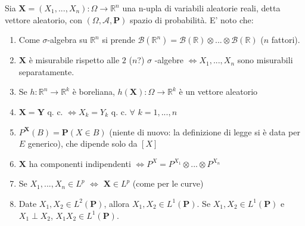 \documentclass{article}
\begin{document}
Sia $\mathbf{X}=\left( X_{1},...,X_{n}\right) :\Omega \rightarrow 
\mathbb{R}
^{n}$ una n-upla di variabili aleatorie reali, detta vettore aleatorio, con $%
\left( \Omega ,\mathcal{A},\mathbf{P}\right) $ spazio di probabilit\`{a}. E'
noto che:

\begin{enumerate}
\item Come $\sigma $-algebra su $%
\mathbb{R}
^{n}$ si prende $\mathcal{B}\left( 
\mathbb{R}
^{n}\right) =\mathcal{B}\left( 
\mathbb{R}
\right) \otimes ...\otimes \mathcal{B}\left( 
\mathbb{R}
\right) $ ($n$ fattori).

\item $\mathbf{X}$ \`{e} misurabile rispetto alle $2$ ($n$?) $\sigma $%
-algebre $\Longleftrightarrow X_{1},...,X_{n}$ sono misurabili separatamente.

\item Se $h:%
\mathbb{R}
^{n}\rightarrow 
\mathbb{R}
^{k}$ \`{e} boreliana, $h\left( \mathbf{X}\right) :\Omega \rightarrow 
\mathbb{R}
^{k}$ \`{e} un vettore aleatorio

\item $\mathbf{X=Y}$ q. c. $\Longleftrightarrow X_{k}=Y_{k}$ q. c. $\forall $
$k=1,...,n$

\item $P^{\mathbf{X}}\left( B\right) =\mathbf{P}\left( X\in B\right) $
(niente di nuovo: la definizione di legge si \`{e} data per $E$ generico),
che dipende solo da $\left[ X\right] $

\item $\mathbf{X}$ ha componenti indipendenti $\Longleftrightarrow
P^{X}=P^{X_{1}}\otimes ...\otimes P^{X_{n}}$

\item Se $X_{1},...,X_{n}\in L^{p}$ $\Longleftrightarrow $ $\mathbf{X}\in
L^{p}$ (come per le curve)

\item Date $X_{1},X_{2}\in L^{2}\left( \mathbf{P}\right) $, allora $%
X_{1},X_{2}\in L^{1}\left( \mathbf{P}\right) $. Se $X_{1},X_{2}\in
L^{1}\left( \mathbf{P}\right) $ e $X_{1}\perp X_{2}$, $X_{1}X_{2}\in
L^{1}\left( \mathbf{P}\right) $.
\end{enumerate}
\end{document}
